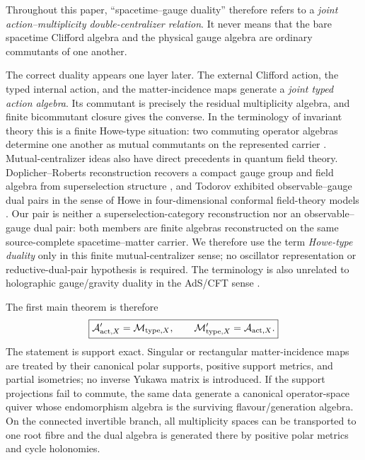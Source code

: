 \documentclass[11pt]{article}
\theoremstyle{definition}
\theoremstyle{remark}
\newcommand{\A}{\mathcal A}
\newcommand{\M}{\mathcal M}
\begin{document}
\noindent
Throughout this paper, ``spacetime--gauge duality'' therefore refers to a
\emph{joint action--multiplicity double-centralizer relation}.  It never means
that the bare spacetime Clifford algebra and the physical gauge algebra are
ordinary commutants of one another.

The correct duality appears one layer later.  The external Clifford action, the
typed internal action, and the matter-incidence maps generate a \emph{joint
typed action algebra}.  Its commutant is precisely the residual multiplicity
algebra, and finite bicommutant closure gives the converse.  In the terminology
of invariant theory this is a finite Howe-type situation: two commuting
operator algebras determine one another as mutual commutants on the represented
carrier \cite{Howe1989}.  Mutual-centralizer ideas also have direct precedents
in quantum field theory.  Doplicher--Roberts reconstruction recovers a compact
gauge group and field algebra from superselection structure
\cite{DoplicherRoberts1989,DoplicherRoberts1990}, and Todorov exhibited
observable--gauge dual pairs in the sense of Howe in four-dimensional
conformal field-theory models \cite{Todorov2010}.  Our pair is neither a
superselection-category reconstruction nor an observable--gauge dual pair:
both members are finite algebras reconstructed on the same source-complete
spacetime--matter carrier.  We therefore use the term \emph{Howe-type duality}
only in this finite mutual-centralizer sense; no oscillator representation or
reductive-dual-pair hypothesis is required.  The terminology is also unrelated
to holographic gauge/gravity duality in the AdS/CFT sense
\cite{Maldacena1998,Witten1998}.

The first main theorem is therefore
\begin{equation}
\boxed{
\A_{{\rm act},X}'
=
\M_{{\rm type},X},
\qquad
\M_{{\rm type},X}'
=
\A_{{\rm act},X}.}
\label{eq:intro-main-duality}
\end{equation}
The statement is support exact.  Singular or rectangular matter-incidence maps
are treated by their canonical polar supports, positive support metrics, and
partial isometries; no inverse Yukawa matrix is introduced.  If the support
projections fail to commute, the same data generate a canonical
operator-space quiver whose endomorphism algebra is the surviving
flavour/generation algebra.  On the connected invertible branch, all
multiplicity spaces can be transported to one root fibre and the dual algebra
is generated there by positive polar metrics and cycle holonomies.
\end{document}
